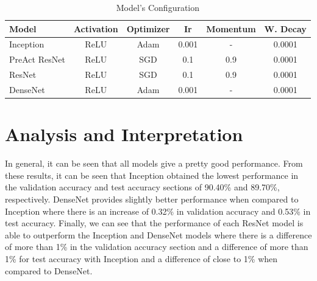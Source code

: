 \documentclass[peerreview]{IEEEtran}
\begin{document}
\begin{table}[H]
\centering
\begin{tabular}{l c c c c c} %
\toprule %
Model & Activation & Optimizer & Ir & Momentum & W. Decay \\ %
\midrule %
Inception & ReLU & Adam & 0.001 & - & 0.0001\\ %
PreAct ResNet & ReLU & SGD & 0.1 & 0.9 & 0.0001\\ %
ResNet & ReLU & SGD & 0.1 & 0.9 & 0.0001\\ %
DenseNet & ReLU & Adam & 0.001 & - & 0.0001\\ %
\midrule %
\midrule %
\end{tabular}
\smallskip
\caption{Model's Configuration} %
\label{tab:model_config} %
\end{table}

\section{Analysis and Interpretation}
In general, it can be seen that all models give a pretty good performance. From these results, it can be seen that Inception obtained the lowest performance in the validation accuracy and test accuracy sections of 90.40\% and 89.70\%, respectively. DenseNet provides slightly better performance when compared to Inception where there is an increase of 0.32\% in validation accuracy and 0.53\% in test accuracy. Finally, we can see that the performance of each ResNet model is able to outperform the Inception and DenseNet models where there is a difference of more than 1\% in the validation accuracy section and a difference of more than 1\% for test accuracy with Inception and a difference of close to 1\% when compared to DenseNet.
\end{document}
